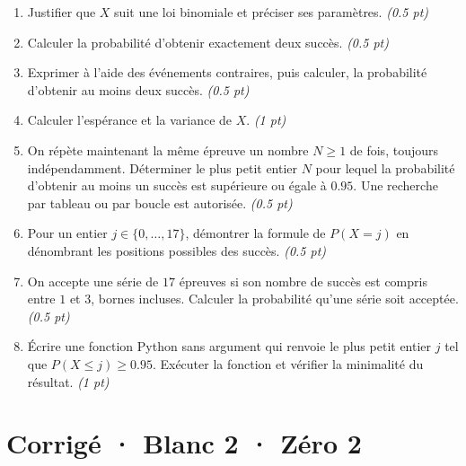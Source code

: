\begin{enumerate}

\item Justifier que $X$ suit une loi binomiale et préciser ses paramètres. \hfill\textit{(\num{0,5} pt)}

\item Calculer la probabilité d'obtenir exactement deux succès. \hfill\textit{(\num{0,5} pt)}

\item Exprimer à l'aide des événements contraires, puis calculer, la probabilité d'obtenir au moins deux succès. \hfill\textit{(\num{0,5} pt)}

\item Calculer l'espérance et la variance de $X$. \hfill\textit{(1 pt)}

\item On répète maintenant la même épreuve un nombre $N\ge1$ de fois, toujours indépendamment. Déterminer le plus petit entier $N$ pour lequel la probabilité d'obtenir au moins un succès est supérieure ou égale à $\num{0,95}$. Une recherche par tableau ou par boucle est autorisée. \hfill\textit{(\num{0,5} pt)}

\item Pour un entier $j\in\{0,\ldots,17\}$, démontrer la formule de $P(X=j)$ en dénombrant les positions possibles des succès. \hfill\textit{(\num{0,5} pt)}

\item On accepte une série de $17$ épreuves si son nombre de succès est compris entre $1$ et $3$, bornes incluses. Calculer la probabilité qu'une série soit acceptée. \hfill\textit{(\num{0,5} pt)}

\item Écrire une fonction Python sans argument qui renvoie le plus petit entier $j$ tel que $P(X\le j)\ge\num{0,95}$. Exécuter la fonction et vérifier la minimalité du résultat. \hfill\textit{(1 pt)}

\end{enumerate}

\ifmxteacher\mxnewpage

\section*{Corrigé · Blanc 2 · Zéro 2}\label{cor:8-2}

